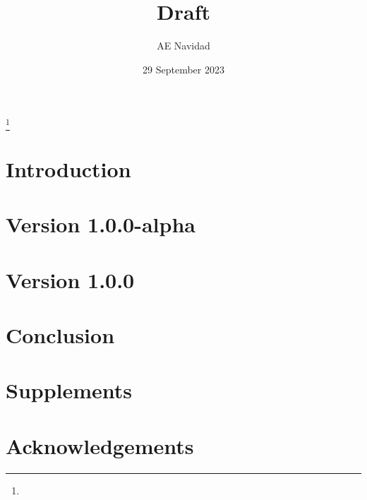 \documentclass{amsart}%
\theoremstyle{definition}%
\theoremstyle{definition}
\begin{document}
%
%
%
\title{Draft}
\author{AE Navidad}
\address{Harvard College, Cambridge, MA}%
{}
\date{29 September 2023}
\thanks{\lipsum[1][1]}%
\begin{abstract}
\lipsum[1]
\end{abstract}
\keywords{\lipsum[1][1]}
\maketitle
%
%
%
\section{Introduction}
\label{s:intro}
\lipsum[1-2]
%
%
%
\section{Version 1.0.0-alpha}
\label{s:valpha}
\lipsum[1-3]
%
%
%
\section{Version 1.0.0}
\label{s:vfirst}
\lipsum[1-3]
%
%
%
\section{Conclusion}
\label{s:conc}
\lipsum[1]
%
%
%
%
%
%
\section*{Supplements}
\label{s:supp}
\lipsum[1][1-3]
%
%
%
\section*{Acknowledgements}
\label{s:acknow}
\lipsum[1]
%
%
%
%
%
%
%
%
\end{document}
